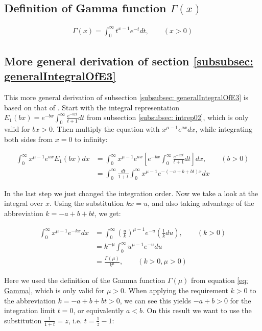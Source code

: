 \documentclass[bibliography=totocnumbered]{scrartcl}
\newcommand{\assume}[1][\text{MISSING PARAMETER}]{,\qquad\left(#1\right)}
\begin{document}
		\subsection[Definition of Gamma function]{Definition of Gamma function $\Gamma\left(x\right)$}
		\label{appsubsec: Gamma}

			\begin{gather}
				\Gamma\left(x\right)=\int_{0}^{\infty}t^{x-1}e^{-t}dt\assume[x>0]\label{eq: Gamma}
			\end{gather}

		\subsection{More general derivation of section \ref{subsubsec: generalIntegralOfE3}}
		\label{appsec: moreGeneralDerivation1}

			This more general derivation of subsection \ref{subsubsec: generalIntegralOfE3} is based on that of \autocite[73\psq]{schloemilch}. Start with the integral representation $E_1\left(bx\right)=e^{-bx}\int_{0}^{\infty}\frac{e^{-bxt}}{t+1}dt$ from subsection \ref{subsubsec: intrep02}, which is only valid for $bx>0$. Then multiply the equation with $x^{\mu-1}e^{ax}dx$, while integrating both sides from $x=0$ to infinity:

			\begin{align}
				\int_{0}^{\infty}x^{\mu-1}e^{ax}E_1\left(bx\right)dx&=\int_{0}^{\infty}x^{\mu-1}e^{ax}\left[e^{-bx}\int_{0}^{\infty}\frac{e^{-bxt}}{t+1}dt\right]dx\assume[b>0]\\
				&=\int_{0}^{\infty}\frac{dt}{1+t}\int_{0}^{\infty}x^{\mu-1}e^{-\left(-a+b+bt\right)x}dx
			\end{align}

			In the last step we just changed the integration order. Now we take a look at the integral over $x$. Using the substitution $kx=u$, and also taking advantage of the abbreviation $k=-a+b+bt$, we get:

			\begin{align}
				\int_{0}^{\infty}x^{\mu-1}e^{-kx}dx&=\int_{0}^{\infty}\left(\frac{u}{k}\right)^{\mu-1}e^{-u}\left(\frac{1}{k}du\right)\assume[k>0]\\
				&=k^{-\mu}\int_{0}^{\infty}u^{\mu-1}e^{-u}du\\
				&=\frac{\Gamma\left(\mu\right)}{k^{\mu}}\assume[k>0, \mu>0]
			\end{align}

			Here we used the definition of the Gamma function $\Gamma\left(\mu\right)$ from equation \eqref{eq: Gamma}, which is only valid for $\mu>0$. When applying the requirement $k>0$ to the abbreviation $k=-a+b+bt>0$, we can see this yields $-a+b>0$ for the integration limit $t=0$, or equivalently $a<b$. On this result we want to use the substitution $\frac{1}{1+t}=z$, i.e. $t=\frac{1}{z}-1$:
\end{document}

